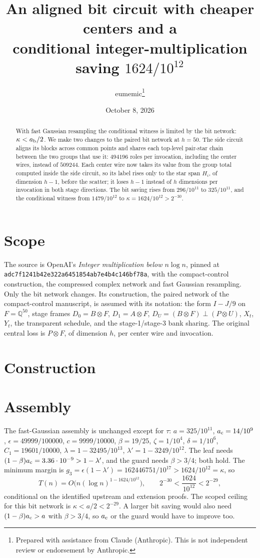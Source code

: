 \documentclass[11pt]{article}
\title{An aligned bit circuit with cheaper centers and a\\
conditional integer-multiplication saving $1624/10^{12}$}
\author{eumemic\thanks{Prepared with assistance from Claude (Anthropic).
This is not independent review or endorsement by Anthropic.}}
\date{October 8, 2026}
\begin{document}
\maketitle
\begin{abstract}
With fast Gaussian resampling the conditional witness is limited by the bit
network: $\kappa<a_{\rm b}/2$. We make two changes to the paired bit network
at $h=50$. The side circuit aligns its blocks across common points and shares
each top-level pair-star chain between the two groups that use it:
$494196$ roles per invocation, including the center wires, instead of
$509244$. Each center wire now takes its value from the group total computed
inside the side circuit, so its label rises only to the star span $H_i$, of
dimension $h-1$, before the scatter; it loses $h-1$ instead of $h$ dimensions
per invocation in both stage directions. The bit saving rises from
$296/10^{11}$ to $325/10^{11}$, and the conditional witness from
$1479/10^{12}$ to $\kappa=1624/10^{12}>2^{-30}$.
\end{abstract}

\section{Scope}
\label{sec:paired-bit-construction}
The source is OpenAI's \emph{Integer multiplication below $n\log n$}, pinned at
\texttt{adc7f1241b42e322a6451854ab7e4b4c146bf78a}, with the compact-control
construction, the compressed complex network and fast Gaussian resampling.
Only the bit network changes. Its construction, the paired network of the
compact-control manuscript, is assumed with its notation: the form $I-J/9$ on
$F=\mathbb Q^{50}$, stage frames $D_0=B\otimes F$, $D_1=A\otimes F$,
$D_U=(B\otimes F)\perp(P\otimes U)$, $X_t$, $Y_t$, the transparent
schedule, and the stage-1/stage-3 bank sharing. The original central loss is
$P\otimes F$, of dimension $h$, per center wire and invocation.

\section{Construction}


\section{Assembly}
The fast-Gaussian assembly is unchanged except for $\tau$:
$a=325/10^{11}$, $a_{\rm c}=14/10^9$, $\epsilon=49999/100000$,
$c=9999/10000$, $\beta=19/25$, $\zeta=1/10^4$, $\delta=1/10^6$,
$C_1=19601/10000$, $\lambda=1-32495/10^{13}$, $\lambda'=1-3249/10^{12}$.
The leaf needs $(1-\beta)a_{\rm c}=3.36\cdot10^{-9}>1-\lambda'$, and the guard
needs $\beta>3/4$; both hold. The minimum margin is
$g_3=\epsilon(1-\lambda')=162446751/10^{17}>1624/10^{12}=\kappa$, so
\[
 T(n)=O\bigl(n(\log n)^{1-1624/10^{12}}\bigr),\qquad
 2^{-30}<\frac{1624}{10^{12}}<2^{-29},
\]
conditional on the identified upstream and extension proofs. The scoped
ceiling for this bit network is $\kappa<a/2<2^{-29}$. A larger bit saving
would also need $(1-\beta)a_{\rm c}>a$ with $\beta>3/4$, so $a_{\rm c}$ or
the guard would have to improve too.
\end{document}
